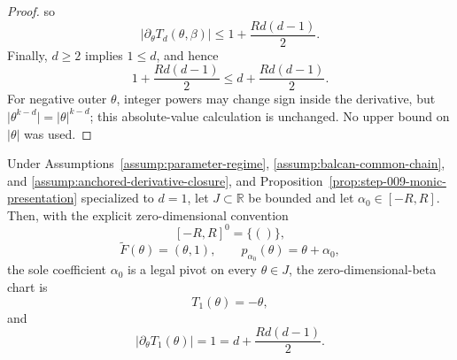 \begin{proof}
so
\begin{equation}
\label{eq:appendix-display-294}
\lvert\partial_\theta T_d(\theta,\beta)\rvert
\leq1+\frac{Rd(d-1)}2.
\end{equation}
Finally, \(d\geq2\) implies \(1\leq d\), and hence
\begin{equation}
\label{eq:appendix-display-295}
1+\frac{Rd(d-1)}2
\leq d+\frac{Rd(d-1)}2.
\end{equation}
For negative outer \(\theta\), integer powers may change sign inside the derivative, but
\(\lvert\theta^{k-d}\rvert=\lvert\theta\rvert^{k-d}\); this absolute-value calculation is unchanged. No upper bound on \(\lvert\theta\rvert\) was used.
\end{proof}

\begin{proposition} \label{prop:step-009-linear-case}
Under Assumptions~\ref{assump:parameter-regime}, \ref{assump:balcan-common-chain}, and \ref{assump:anchored-derivative-closure}, and Proposition~\ref{prop:step-009-monic-presentation} specialized to \(d=1\), let \(J\subset\mathbb R\) be bounded and let \(\alpha_0\in[-R,R]\). Then, with the explicit zero-dimensional convention
\begin{equation}
\label{eq:appendix-display-296}
[-R,R]^0=\{()\},
\end{equation}
\begin{equation}
\label{eq:appendix-display-297}
\widetilde F(\theta)=(\theta,1),
\qquad
p_{\alpha_0}(\theta)=\theta+\alpha_0,
\end{equation}
the sole coefficient \(\alpha_0\) is a legal pivot on every \(\theta\in J\), the zero-dimensional-beta chart is
\begin{equation}
\label{eq:appendix-display-298}
T_1(\theta)=-\theta,
\end{equation}
and
\begin{equation}
\label{eq:appendix-display-299}
\lvert\partial_\theta T_1(\theta)\rvert=1
=d+\frac{Rd(d-1)}2.
\end{equation}


\end{proposition}

